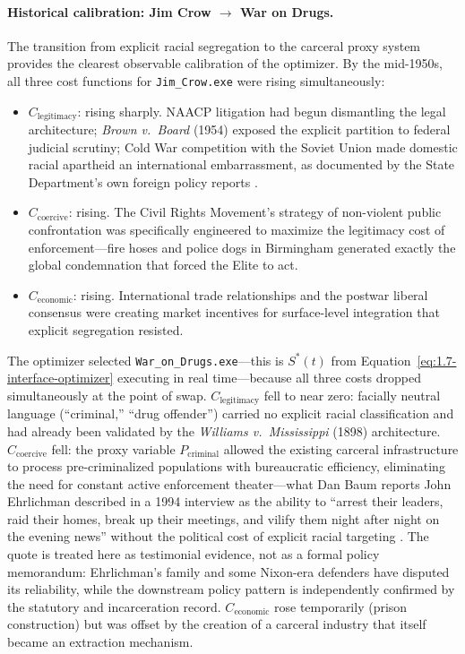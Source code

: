 \paragraph{Historical calibration: Jim Crow $\to$ War on Drugs.}
The transition from explicit racial segregation to the carceral proxy system provides the clearest observable calibration of the optimizer. By the mid-1950s, all three cost functions for \texttt{Jim\_Crow.exe} were rising simultaneously:

\begin{itemize}[leftmargin=*]
    \item $C_{\text{legitimacy}}$: rising sharply. NAACP litigation had begun dismantling the legal architecture; \textit{Brown v.\ Board} (1954) exposed the explicit partition to federal judicial scrutiny; Cold War competition with the Soviet Union made domestic racial apartheid an international embarrassment, as documented by the State Department's own foreign policy reports \cite{dudziak}.
    \item $C_{\text{coercive}}$: rising. The Civil Rights Movement's strategy of non-violent public confrontation was specifically engineered to maximize the legitimacy cost of enforcement---fire hoses and police dogs in Birmingham generated exactly the global condemnation that forced the Elite to act.
    \item $C_{\text{economic}}$: rising. International trade relationships and the postwar liberal consensus were creating market incentives for surface-level integration that explicit segregation resisted.
\end{itemize}

The optimizer selected \texttt{War\_on\_Drugs.exe}---this is $S^*(t)$ from Equation~\ref{eq:1.7-interface-optimizer} executing in real time---because all three costs dropped simultaneously at the point of swap. $C_{\text{legitimacy}}$ fell to near zero: facially neutral language (``criminal,'' ``drug offender'') carried no explicit racial classification and had already been validated by the \textit{Williams v.\ Mississippi} (1898) architecture. $C_{\text{coercive}}$ fell: the proxy variable $P_{\text{criminal}}$ allowed the existing carceral infrastructure to process pre-criminalized populations with bureaucratic efficiency, eliminating the need for constant active enforcement theater---what Dan Baum reports John Ehrlichman described in a 1994 interview as the ability to ``arrest their leaders, raid their homes, break up their meetings, and vilify them night after night on the evening news'' without the political cost of explicit racial targeting \cite{baum}. The quote is treated here as testimonial evidence, not as a formal policy memorandum: Ehrlichman's family and some Nixon-era defenders have disputed its reliability, while the downstream policy pattern is independently confirmed by the statutory and incarceration record. $C_{\text{economic}}$ rose temporarily (prison construction) but was offset by the creation of a carceral industry that itself became an extraction mechanism.

